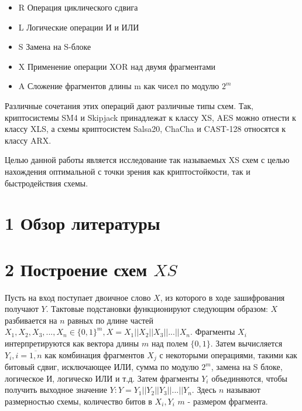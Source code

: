 \documentclass[a4paper,14pt]{extarticle}
\begin{document}
\begin{itemize}
\item R
\newline Операция циклического сдвига
\item L
\newline Логические операции И и ИЛИ
\item S
\newline Замена на S-блоке
\item X
\newline Применение операции XOR над двумя фрагментами
\item A
\newline Сложение фрагментов длины m как чисел по модулю $2^m$
\end{itemize}

Различные сочетания этих операций дают различные типы схем. Так, криптосистемы SM4 и Skipjack принадлежат к классу XS, AES можно отнести к классу XLS, а схемы криптосистем Salsa20, ChaCha и CAST-128 относятся к классу ARX.

Целью данной работы является исследование так называемых XS схем с целью нахождения оптимальной с точки зрения как криптостойкости, так и быстродействия схемы.

\newpage
\section*{1 Обзор литературы}
\vspace*{1cm}


\newpage
\section*{2 Построение схем $XS$}
\vspace*{1cm}

Пусть на вход поступает двоичное слово $X$, из которого в ходе зашифрования получают $Y$. Тактовые подстановки функционируют следующим образом: $X$ разбивается на $n$ равных по длине частей $X_1, X_2, X_3, ..., X_n \in \{0, 1\}^m, X = X_1||X_2||X_3||...||X_n$. Фрагменты $X_i$ интерпретируются как вектора длины $m$ над полем $\{0, 1\}$. Затем вычисляется $Y_i, i = \overline{1,n}$ как комбинация фрагментов $X_j$ с некоторыми операциями, такими как битовый сдвиг, исключающее ИЛИ, сумма по модулю $2^m$, замена на S блоке, логическое И, логическо ИЛИ и т.д. Затем фрагменты $Y_i$ объединяются, чтобы получить выходное значение $Y: Y = Y_1||Y_2||Y_3||...||Y_n$. Здесь $n$ называют размерностью схемы, количество битов в $X_i, Y_i$ $m$ - размером фрагмента.
\end{document}

